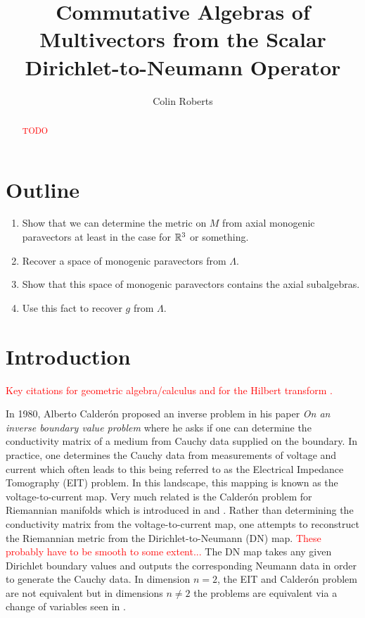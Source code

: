 \documentclass[12pt]{article}
\title{Commutative Algebras of Multivectors from the Scalar Dirichlet-to-Neumann Operator}
\author{Colin Roberts}
\begin{document}
 \begin{titlingpage}
     \maketitle
     \vfill
     \begin{abstract}
        \textcolor{red}{TODO}
     \end{abstract}
 \end{titlingpage}

\section{Outline}
\begin{enumerate}
    \item Show that we can determine the metric on $M$ from axial monogenic paravectors at least in the case for $\mathbb{R}^3$ or something.
    \item Recover a space of monogenic paravectors from $\Lambda$.
    \item Show that this space of monogenic paravectors contains the axial subalgebras.
    \item Use this fact to recover $g$ from $\Lambda$.
\end{enumerate}

\section{Introduction}

\textcolor{red}{Key citations for geometric algebra/calculus \cite{doran_geometric_2003, hestenes_clifford_1984} and for the Hilbert transform \cite{brackx_hilbert_2008, belishev_dirichlet_2008}. } 

In 1980, Alberto Calder\'on proposed an inverse problem in his paper \emph{On an inverse boundary value problem} \cite{calderon_inverse_2006} where he asks if one can determine the conductivity matrix of a medium from Cauchy data supplied on the boundary.  In practice, one determines the Cauchy data from measurements of voltage and current which often leads to this being referred to as the Electrical Impedance Tomography (EIT) problem.  In this landscape, this mapping is known as the voltage-to-current map. Very much related is the Calder\'on problem for Riemannian manifolds which is introduced in \cite{feldman_calderproblem_nodate} and \cite{salo_calderon_nodate}.  Rather than determining the conductivity matrix from the voltage-to-current map, one attempts to reconstruct the Riemannian metric from the Dirichlet-to-Neumann (DN) map.  \textcolor{red}{These probably have to be smooth to some extent...} The DN map takes any given Dirichlet boundary values and outputs the corresponding Neumann data in order to generate the Cauchy data. In dimension $n=2$, the EIT and Calder\'on problem are not equivalent but in dimensions $n\neq 2$ the problems are equivalent via a change of variables seen in \cite{uhlmann_inverse_2014}.
\end{document}
